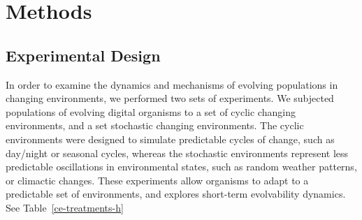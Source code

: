 \documentclass[PhD]{msu-thesis}
\begin{document}
\section{Methods}

\subsection{Experimental Design}
In order to examine the dynamics and mechanisms of evolving populations in changing environments, we performed two sets of experiments. We subjected populations of evolving digital organisms to a set of cyclic changing environments, and a set stochastic changing environments. The cyclic environments were designed to simulate predictable cycles of change, such as day/night or seasonal cycles, whereas the stochastic environments represent less predictable oscillations in environmental states, such as random weather patterns, or climactic changes. These experiments allow organisms to adapt to a predictable set of environments, and explores short-term evolvability dynamics. See Table~\ref{ce-treatments-h}

\end{document}
